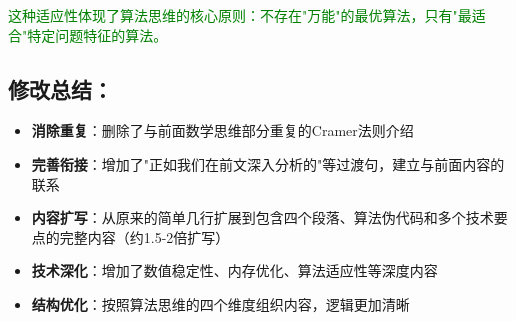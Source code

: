 \documentclass{article}
\newcommand{\greenadd}[1]{\textcolor{green}{#1}}
\begin{document}
\greenadd{这种适应性体现了算法思维的核心原则：不存在"万能"的最优算法，只有"最适合"特定问题特征的算法。}

\subsection*{修改总结：}

\begin{itemize}
\item \textbf{消除重复}：删除了与前面数学思维部分重复的Cramer法则介绍
\item \textbf{完善衔接}：增加了"正如我们在前文深入分析的"等过渡句，建立与前面内容的联系
\item \textbf{内容扩写}：从原来的简单几行扩展到包含四个段落、算法伪代码和多个技术要点的完整内容（约1.5-2倍扩写）
\item \textbf{技术深化}：增加了数值稳定性、内存优化、算法适应性等深度内容
\item \textbf{结构优化}：按照算法思维的四个维度组织内容，逻辑更加清晰
\end{itemize}
\end{document}

